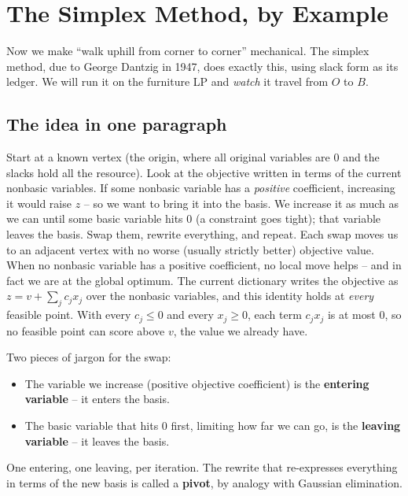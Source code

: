 \section{The Simplex Method, by Example}
\label{ch28:simplex}

Now we make ``walk uphill from corner to corner'' mechanical. The simplex
method, due to George Dantzig in 1947, does exactly this, using slack form as
its ledger. We will run it on the furniture LP and \emph{watch} it travel from
$O$ to $B$.

\subsection{The idea in one paragraph}

Start at a known vertex (the origin, where all original variables are 0 and the
slacks hold all the resource). Look at the objective written in terms of the
current nonbasic variables. If some nonbasic variable has a \emph{positive}
coefficient, increasing it would raise $z$ -- so we want to bring it into the
basis. We increase it as much as we can until some basic variable hits 0 (a
constraint goes tight); that variable leaves the basis. Swap them, rewrite
everything, and repeat. Each swap moves us to an adjacent vertex with no worse
(usually strictly better) objective value. When no nonbasic variable has a
positive coefficient, no local move helps -- and in fact we are at the global
optimum. The current dictionary writes the objective as $z = v + \sum_j c_j x_j$
over the nonbasic variables, and this identity holds at \emph{every} feasible
point. With every $c_j \le 0$ and every $x_j \ge 0$, each term $c_j x_j$ is at
most $0$, so no feasible point can score above $v$, the value we already have.

\begin{focusbox}
Two pieces of jargon for the swap:
\begin{itemize}
\item The variable we increase (positive objective coefficient) is the
  \textbf{entering variable} -- it enters the basis.
\item The basic variable that hits 0 first, limiting how far we can go, is the
  \textbf{leaving variable} -- it leaves the basis.
\end{itemize}
One entering, one leaving, per iteration. The rewrite that re-expresses
everything in terms of the new basis is called a \textbf{pivot}, by analogy
with Gaussian elimination.
\end{focusbox}

